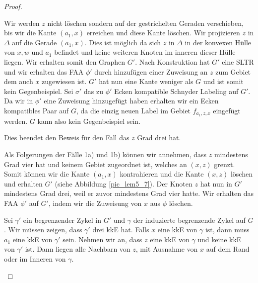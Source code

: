 \begin{proof}
\begin{description}[leftmargin =0pt, font = \bfseries]
Wir werden $z$ nicht löschen sondern auf der gestrichelten Geraden verschieben, bis wir die Kante $(a_1,x)$ erreichen und diese Kante löschen. Wir projizieren $z$ in $\Delta$ auf die Gerade $(a_1,x)$. Dies ist möglich da sich $z$ in $\Delta$ in der konvexen Hülle von $x,w$ und $a_1$ befindet und keine weiteren Knoten im inneren dieser Hülle liegen. Wir erhalten somit den Graphen $G'$. Nach Konstruktion hat $G'$ eine SLTR und wir erhalten das FAA $\phi'$ durch hinzufügen einer Zuweisung an $z$ zum Gebiet dem auch $x$ zugewiesen ist. $G'$ hat nun eine Kante weniger als $G$ und ist somit kein Gegenbeispiel. Sei $\sigma'$ das zu $\phi'$ Ecken kompatible Schnyder Labeling auf $G'$. Da wir in $\phi'$ eine Zuweisung hinzugefügt haben erhalten wir ein Ecken kompatibles Paar auf $G$, da die einzig neuen Label im Gebiet $f_{a_1,z,x}$ eingefügt werden. $G$ kann also kein Gegenbeispiel sein.

Dies beendet den Beweis für den Fall das $z$ Grad drei hat.

\item[Fall 1c)] Als Folgerungen der Fälle 1a) und 1b) können wir annehmen, dass $z$ mindestens Grad vier hat und keinem Gebiet zugeordnet ist, welches an $(x,z)$ grenzt. Somit können wir die Kante $(a_1,x)$ kontrahieren und die Kante $(x,z)$ löschen und erhalten $G'$ (siehe Abbildung \ref{pic_lem5_7}). Der Knoten $z$ hat nun in $G'$ mindestens Grad drei, weil er zuvor mindestens Grad vier hatte. Wir erhalten das FAA $\phi'$ auf $G'$, indem wir die Zuweisung von $x$ aus $\phi$ löschen. 

Sei $\gamma'$ ein begrenzender Zykel in $G'$ und $\gamma$ der induzierte begrenzende Zykel auf $G$. Wir müssen zeigen, dass $\gamma'$ drei kkE hat. Falls $x$ eine kkE von $\gamma$ ist, dann muss $a_1$ eine kkE von $\gamma'$ sein. Nehmen wir an, dass $z$ eine kkE von $\gamma$ und keine kkE von $\gamma'$ ist. Dann liegen alle Nachbarn von $z$, mit Ausnahme von $x$ auf dem Rand oder im Inneren von $\gamma$. 



\end{description}
\end{proof}
